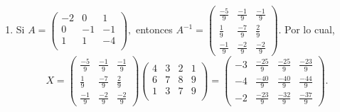 \begin{prob}
\begin{myproof}
\begin{enumerate}[$(a)$]
\item Si $A=\left( \begin{array}{ccc}
-2&0&1\\
0&-1&-1\\
1&1&-4\\
\end{array} \right),$ entonces $A^{-1}=\begin{pmatrix}
\frac{-5}{9} & \frac{-1}{9} & \frac{-1}{9} \\
\frac{1}{9} & \frac{-7}{9} & \frac{2}{9} \\
\frac{-1}{9} & \frac{-2}{9} & \frac{-2}{9}
\end{pmatrix}.$ Por lo cual, 
$$X=\begin{pmatrix}
\frac{-5}{9} & \frac{-1}{9} & \frac{-1}{9} \\
\frac{1}{9} & \frac{-7}{9} & \frac{2}{9} \\
\frac{-1}{9} & \frac{-2}{9} & \frac{-2}{9}
\end{pmatrix}\left( \begin{array}{cccc}
4&3&2&1\\
6&7&8&9\\
1&3&7&9\\
\end{array} \right)=\boxed{\begin{pmatrix}
-3 & \frac{-25}{9} & \frac{-25}{9} & \frac{-23}{9} \\
-4 & \frac{-40}{9} & \frac{-40}{9} & \frac{-44}{9} \\
-2 & \frac{-23}{9} & \frac{-32}{9} & \frac{-37}{9}
\end{pmatrix}}.$$
\end{enumerate}
\end{myproof}
\end{prob}

